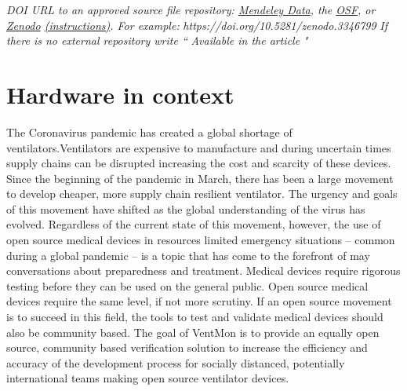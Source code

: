 \documentclass[11pt, letterpaper]{article}
\begin{document}
\begin{flushleft}
\begin{tabu}
  \textit{DOI URL to an approved source file repository:  \href{https://data.mendeley.com/}{Mendeley Data}, the \href{http://osf.io}{OSF}, or \href{https://zenodo.org/}{Zenodo} \href{https://doi.org/10.5281/zenodo.3346799}{(instructions)}. For example:} \textit{https://doi.org/10.5281/zenodo.3346799} \linebreak \linebreak
  \textit{If there is no external repository write “} \textit{Available in the article} \textit{"}
\\\hline
\end{tabu}
\end{flushleft}

\section{Hardware in context}
The Coronavirus pandemic has created a global shortage of ventilators.Ventilators are expensive to manufacture and during uncertain times supply chains can be disrupted increasing the cost and scarcity of these devices. Since the beginning of the pandemic in March, there has been a large movement to develop cheaper, more supply chain resilient ventilator. The urgency and goals of this movement have shifted as the global understanding of the virus has evolved. Regardless of the current state of this movement, however, the use of open source medical devices in resources limited emergency situations -- common during a global pandemic -- is a topic that has come to the forefront of may conversations about preparedness and treatment. Medical devices require rigorous testing before they can be used on the general public. Open source medical devices require the same level, if not more scrutiny. If an open source movement is to succeed in this field, the tools to test and validate medical devices should also be community based. The goal of VentMon is to provide an equally open source, community based verification solution to increase the efficiency and accuracy of the development process for socially distanced, potentially international teams making open source ventilator devices.
\end{document}
